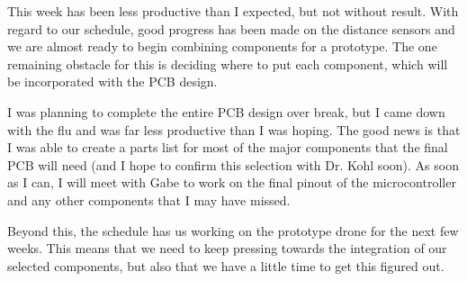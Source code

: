 \documentclass[12pt, titlepage]{article}
\begin{document}
This week has been less productive than I expected, but not without result. With regard to our schedule, good progress has been made on the distance sensors and we are almost ready to begin combining components for a prototype. The one remaining obstacle for this is deciding where to put each component, which will be incorporated with the PCB design.

I was planning to complete the entire PCB design over break, but I came down with the flu and was far less productive than I was hoping. The good news is that I was able to create a parts list for most of the major components that the final PCB will need (and I hope to confirm this selection with Dr. Kohl soon). As soon as I can, I will meet with Gabe to work on the final pinout of the microcontroller and any other components that I may have missed.

Beyond this, the schedule has us working on the prototype drone for the next few weeks. This means that we need to keep pressing towards the integration of our selected components, but also that we have a little time to get this figured out.
\end{document}
